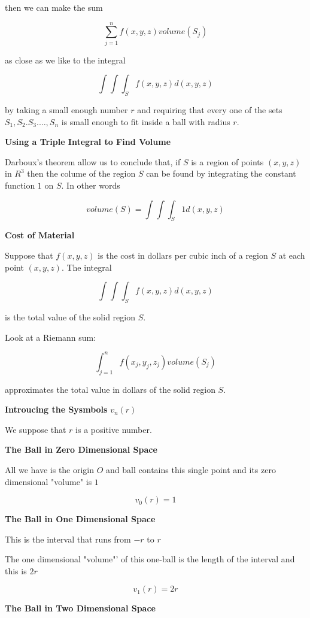 \vskip 1mm
then we can make the sum

$$\sum_{j=1}^nf(x,y,z)volume(S_j)$$

as close as we like to the integral

$$\int\int\int_Sf(x,y,z)d(x,y,z)$$

by taking a small enough number $r$ and requiring that every one of the sets $S_1,S_2.S_3.\ldots,S_n$ is small enough to fit inside a ball with radius $r$.

\filbreak
\vskip 1cm
{\bf Using a Triple Integral to Find Volume}

\vskip 1mm
Darboux's theorem allow us to conclude that, if $S$ is a region of points $(x,y,z)$ in $R^3$ then the colume of the region $S$ can be found by integrating the constant function $1$ on $S$. In other words

$$volume(S)=\int\int\int_S1d(x,y,z)$$

\filbreak
\vskip 1cm
{\bf Cost of Material}

\vskip 1mm
Suppose that $f(x,y,z)$ is the cost in dollars per cubic inch of a region $S$ at each point $(x,y,z)$. The integral

$$\int\int\int_Sf(x,y,z)d(x,y,z)$$

is the total value of the solid region $S$.

\vskip 1mm
Look at a Riemann sum:

$$\int_{j=1}^nf(x_j,y_j,z_j)volume(S_j)$$

approximates the total value in dollars of the solid region $S$.

\filbreak
\vskip 1cm
{\bf Introucing the Sysmbols} $v_n(r)$

\vskip 1mm
We suppose that $r$ is a positive number.

\vskip 1mm
{\bf The Ball in Zero Dimensional Space}

\vskip 1mm
All we have is the origin $O$ and ball contains this single point and its zero dimensional "volume" is $1$

$$v_0(r)=1$$

\vskip 1mm
{\bf The Ball in One Dimensional Space}

\vskip 1mm
This is the interval that runs from $-r$ to $r$

\vskip 1mm
The one dimensional "volume"' of this one-ball is the length of the interval and this is $2r$

$$v_1(r)=2r$$

\vskip 1mm
{\bf The Ball in Two Dimensional Space}

